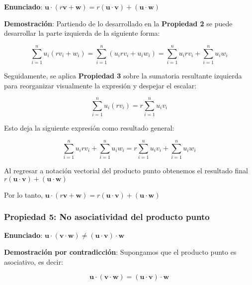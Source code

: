 \documentclass[12 pt]{article}
\begin{document}
\begin{center}
\textbf{Enunciado}: \(\mathbf{u} \cdot (r \mathbf{v} + \mathbf{w}) = r (\mathbf{u} \cdot \mathbf{v}) + (\mathbf{u} \cdot \mathbf{w})\)\\
\end{center}

\textbf{Demostración}: Partiendo de lo desarrollado en la \textbf{Propiedad 2} se puede desarrollar la parte izquierda de la siguiente forma:

\[
\sum_{i=1}^{n} u_i (r v_i + w_i) = \sum_{i=1}^{n} (u_i r v_i + u_i w_i) = \sum_{i=1}^{n} u_i r v_i + \sum_{i=1}^{n} u_i w_i
\]

Seguidamente, se aplica \textbf{Propiedad 3} sobre la sumatoria resultante izquierda para reorganizar visualmente la expresión y despejar el escalar:

\[
\sum_{i=1}^{n} u_i (r v_i) = r \sum_{i=1}^{n} u_i v_i
\]

Esto deja la siguiente expresión como resultado general:

\[
\sum_{i=1}^{n} u_i r v_i + \sum_{i=1}^{n} u_i w_i = r \sum_{i=1}^{n} u_i v_i + \sum_{i=1}^{n} u_i w_i
\]

Al regresar a notación vectorial del producto punto obtenemos el resultado final \(r (\mathbf{u} \cdot \mathbf{v}) + (\mathbf{u} \cdot \mathbf{w})\)

\begin{center}
Por lo tanto, \(\mathbf{u} \cdot (r \mathbf{v} + \mathbf{w}) = r (\mathbf{u} \cdot \mathbf{v}) + (\mathbf{u} \cdot \mathbf{w})\)\\
\end{center}


\subsubsection*{Propiedad 5: No asociatividad del producto punto}

\begin{center}
\textbf{Enunciado}: \(\mathbf{u} \cdot (\mathbf{v} \cdot \mathbf{w}) \neq (\mathbf{u} \cdot \mathbf{v}) \cdot \mathbf{w}\)\\
\end{center}

\textbf{Demostración por contradicción}: Supongamos que el producto punto es asociativo, es decir:

\[
\mathbf{u} \cdot (\mathbf{v} \cdot \mathbf{w}) = (\mathbf{u} \cdot \mathbf{v}) \cdot \mathbf{w}
\]
\end{document}
